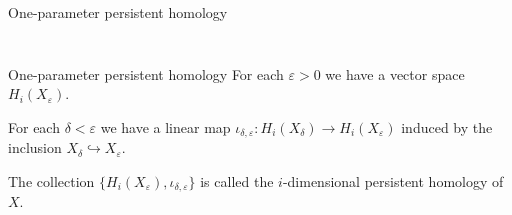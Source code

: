 \documentclass{beamer}
\begin{document}
\begin{frame}{One-parameter persistent homology}
\begin{columns}[T]
\begin{column}{0.5\textwidth}
{\begin{figure}
                \end{figure}}
            \end{column}
        \end{columns}
    \end{frame}
    \begin{frame}{One-parameter persistent homology}
        For each $\varepsilon>0$ we have a vector space $H_i(X_\varepsilon)$.\pause

        For each $\delta<\varepsilon$ we have a linear map $\iota_{\delta,\varepsilon}\colon H_i(X_\delta)\to H_i(X_\varepsilon)$ induced by the inclusion $X_\delta\hookrightarrow X_\varepsilon$.\pause

        \begin{definition}
            The collection $\{H_i(X_\varepsilon),\iota_{\delta,\varepsilon}\}$ is called the \alert{$i$-dimensional persistent homology} of $X$.
        \end{definition}
    \end{frame}
\end{document}
